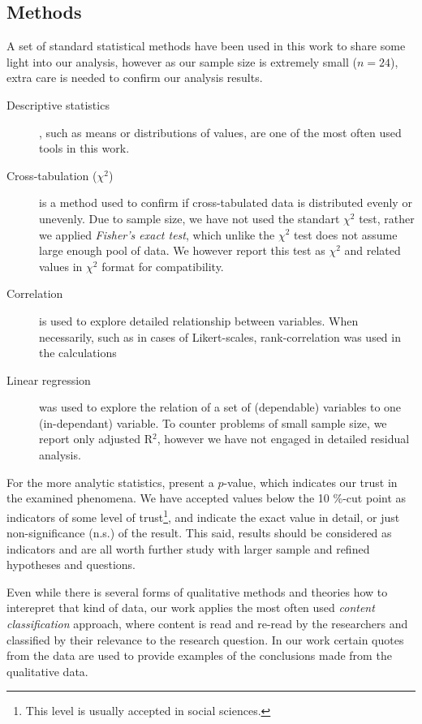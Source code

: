 \subsection{Methods}
\label{sec:methods}

A set of standard statistical methods have been used in this work to share some light into our analysis, however as our sample size is extremely small ($n=24$), extra care is needed to confirm our analysis results.

\begin{description}
\item[Descriptive statistics], such as means or distributions of values, are one of the most often used tools in this work.
\item[Cross-tabulation ($\chi^2$)] is a method used to confirm if cross-tabulated data is distributed evenly or unevenly. Due to sample size, we have not used the standart $\chi^2$ test, rather we applied \textit{Fisher's exact test}, which unlike the $\chi^2$ test does not assume large enough pool of data. We however report this test as $\chi^2$ and related values in $\chi^2$ format for compatibility.
\item[Correlation] is used to explore detailed relationship between variables. When necessarily, such as in cases of Likert-scales, rank-correlation was used in the calculations
\item[Linear regression] was used to explore the relation of a set of (dependable) variables to one (in-dependant) variable. To counter problems of small sample size, we report only adjusted R$^2$, however we have not engaged in detailed residual analysis.
\end{description}

\noindent For the more analytic statistics, present a $p$-value, which indicates our trust in the examined phenomena. We have accepted values below the 10 \%-cut point as indicators of some level of trust\footnote{This level is usually accepted in social sciences.}, and indicate the exact value in detail, or just non-significance (n.s.) of the result. This said, results should be considered as indicators and are all worth further study with larger sample and refined hypotheses and questions.

Even while there is several forms of qualitative methods and theories how to interepret that kind of data, our work applies the most often used \textit{content classification} approach, where content is read and re-read by the researchers and classified by their relevance to the research question. In our work certain quotes from the data are used to provide examples of the conclusions made from the qualitative data.